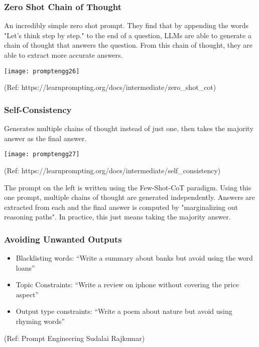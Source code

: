 \begin{frame}[fragile]\frametitle{Zero Shot Chain of Thought}

An incredibly simple zero shot prompt. They find that by appending the words "Let's think step by step." to the end of a question, LLMs are able to generate a chain of thought that answers the question. From this chain of thought, they are able to extract more accurate answers.

\begin{center}
\texttt{[image: promptengg26]}

{\tiny (Ref: https://learnprompting.org/docs/intermediate/zero\_shot\_cot)}

\end{center}		

\end{frame}



\begin{frame}[fragile]\frametitle{Self-Consistency}

Generates multiple chains of thought instead of just one, then takes the majority answer as the final answer.

\begin{center}
\texttt{[image: promptengg27]}

{\tiny (Ref: https://learnprompting.org/docs/intermediate/self\_consistency)}

\end{center}		

The prompt on the left is written using the Few-Shot-CoT paradigm. Using this one prompt, multiple chains of thought are generated independently. Answers are extracted from each and the final answer is computed by "marginalizing out reasoning paths". In practice, this just means taking the majority answer.

\end{frame}

\begin{frame}[fragile]\frametitle{ Avoiding Unwanted Outputs}


\begin{itemize}
\item  Blacklisting words: ``Write a summary about banks but avoid using the word loans''
\item Topic Constraints: ``Write a review on iphone without covering the price aspect''
\item Output type constraints: ``Write a poem about nature but avoid using rhyming words''
\end{itemize}	 

		
		
{\tiny (Ref: Prompt Engineering Sudalai Rajkumar)}


\end{frame}

